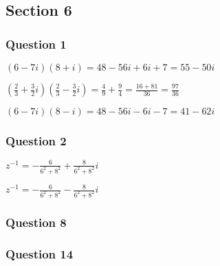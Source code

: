 \documentclass{article}
\begin{document}
\subsection{Section 6}
\subsubsection{Question 1}

 $(6-7i)(8+i) = 48 - 56i + 6i + 7 = 55-50i$

 $(\frac 23 + \frac 32i)(\frac23 - \frac 32i) = \frac49+\frac94=\frac{16+81}{36} = \frac{97}{36}$

 $(6-7i)(8-i) = 48-56i-6i-7 = 41-62i$

\subsubsection{Question 2}


 $z^{-1} = -\frac{6}{6^2+8^2} + \frac8{6^2+8^2}i$

 $z^{-1} = -\frac{6}{6^2+8^2} - \frac8{6^2+8^2}i$

\subsubsection{Question 8}
\subsubsection{Question 14}
\end{document}
